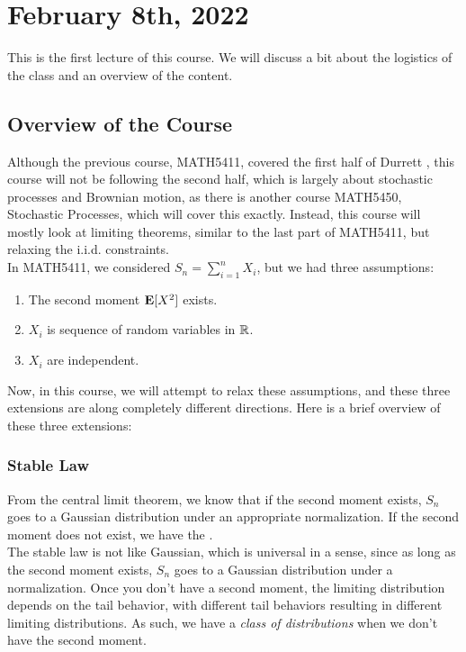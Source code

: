 \documentclass[../main/main.tex]{subfiles}
\begin{document}
\section{February 8th, 2022}

This is the first lecture of this course. We will discuss a bit about the logistics of the class and an overview of the content.

\subsection{Overview of the Course}

Although the previous course, MATH5411, covered the first half of Durrett \cite{Durrett19}, this course will not be following the second half, which is largely about stochastic processes and Brownian motion, as there is another course MATH5450, Stochastic Processes, which will cover this exactly. Instead, this course will mostly look at limiting theorems, similar to the last part of MATH5411, but relaxing the i.i.d. constraints.\\

In MATH5411, we considered $S_n = \sum\limits_{i=1}^{n} X_i$, but we had three assumptions:
\begin{enumerate}
	\item The second moment $\text{\textbf{E}}[X^2]$ exists.
	\item $X_i$ is sequence of random variables in $\mathbb{R}$.
	\item $X_i$ are independent.
\end{enumerate}

Now, in this course, we will attempt to relax these assumptions, and these three extensions are along completely different directions. Here is a brief overview of these three extensions:

\subsubsection{Stable Law}

From the central limit theorem, we know that if the second moment exists, $S_n$  goes to a Gaussian distribution under an appropriate normalization. If the second moment does not exist, we have the .\\

The stable law is not like Gaussian, which is universal in a sense, since as long as the second moment exists, $S_n$ goes to a Gaussian distribution under a normalization. Once you don't have a second moment, the limiting distribution depends on the tail behavior, with different tail behaviors resulting in different limiting distributions. As such, we have a \textit{class of distributions} when we don't have the second moment.\\
\end{document}
